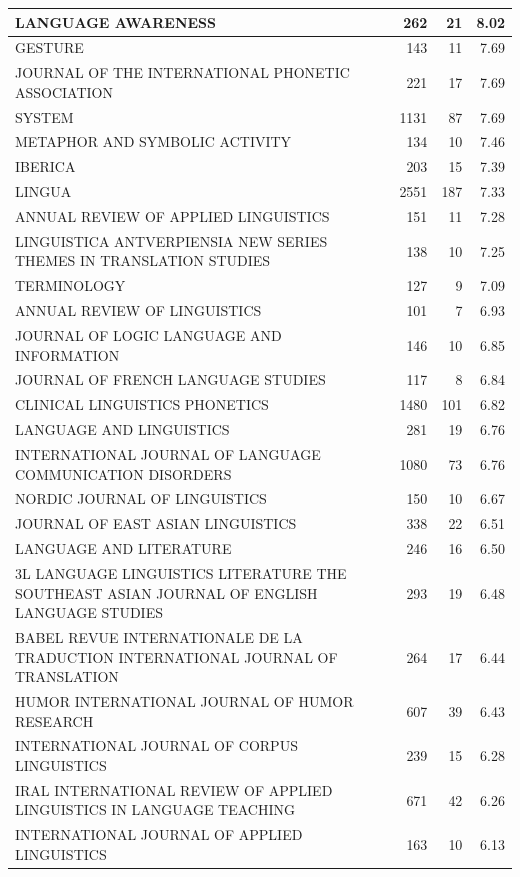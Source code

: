 \documentclass[]{elsarticle} %
\begin{document}
\begin{table}
\begin{tabular}[t]{l|r|r|r}
\hline
LANGUAGE AWARENESS & 262 & 21 & 8.02\\
\hline
GESTURE & 143 & 11 & 7.69\\
\hline
JOURNAL OF THE INTERNATIONAL PHONETIC ASSOCIATION & 221 & 17 & 7.69\\
\hline
SYSTEM & 1131 & 87 & 7.69\\
\hline
METAPHOR AND SYMBOLIC ACTIVITY & 134 & 10 & 7.46\\
\hline
IBERICA & 203 & 15 & 7.39\\
\hline
LINGUA & 2551 & 187 & 7.33\\
\hline
ANNUAL REVIEW OF APPLIED LINGUISTICS & 151 & 11 & 7.28\\
\hline
LINGUISTICA ANTVERPIENSIA NEW SERIES THEMES IN TRANSLATION STUDIES & 138 & 10 & 7.25\\
\hline
TERMINOLOGY & 127 & 9 & 7.09\\
\hline
ANNUAL REVIEW OF LINGUISTICS & 101 & 7 & 6.93\\
\hline
JOURNAL OF LOGIC LANGUAGE AND INFORMATION & 146 & 10 & 6.85\\
\hline
JOURNAL OF FRENCH LANGUAGE STUDIES & 117 & 8 & 6.84\\
\hline
CLINICAL LINGUISTICS PHONETICS & 1480 & 101 & 6.82\\
\hline
LANGUAGE AND LINGUISTICS & 281 & 19 & 6.76\\
\hline
INTERNATIONAL JOURNAL OF LANGUAGE COMMUNICATION DISORDERS & 1080 & 73 & 6.76\\
\hline
NORDIC JOURNAL OF LINGUISTICS & 150 & 10 & 6.67\\
\hline
JOURNAL OF EAST ASIAN LINGUISTICS & 338 & 22 & 6.51\\
\hline
LANGUAGE AND LITERATURE & 246 & 16 & 6.50\\
\hline
3L LANGUAGE LINGUISTICS LITERATURE THE SOUTHEAST ASIAN JOURNAL OF ENGLISH LANGUAGE STUDIES & 293 & 19 & 6.48\\
\hline
BABEL REVUE INTERNATIONALE DE LA TRADUCTION INTERNATIONAL JOURNAL OF TRANSLATION & 264 & 17 & 6.44\\
\hline
HUMOR INTERNATIONAL JOURNAL OF HUMOR RESEARCH & 607 & 39 & 6.43\\
\hline
INTERNATIONAL JOURNAL OF CORPUS LINGUISTICS & 239 & 15 & 6.28\\
\hline
IRAL INTERNATIONAL REVIEW OF APPLIED LINGUISTICS IN LANGUAGE TEACHING & 671 & 42 & 6.26\\
\hline
INTERNATIONAL JOURNAL OF APPLIED LINGUISTICS & 163 & 10 & 6.13\\
\hline
\end{tabular}
\end{table}
\end{document}
